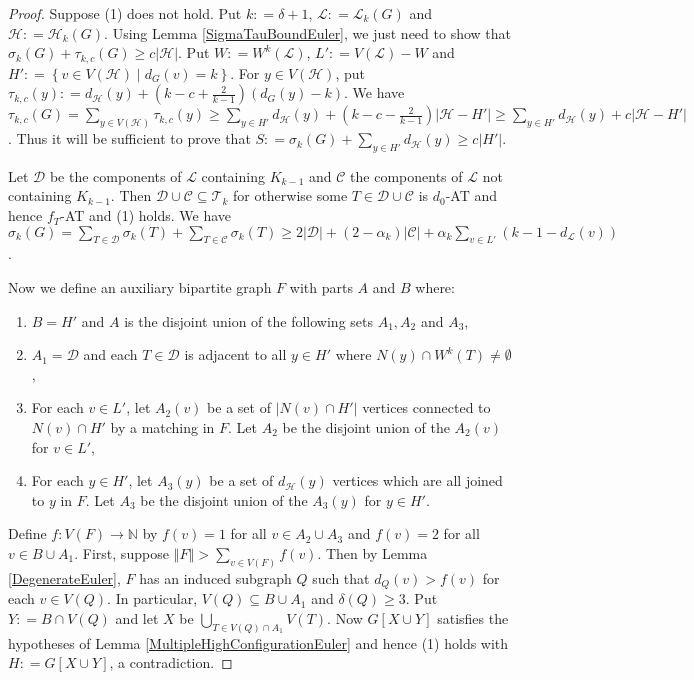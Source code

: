 \documentclass[12pt]{article}
\theoremstyle{plain}
\theoremstyle{definition}
\theoremstyle{remark}
\newcommand{\fancy}[1]{\mathcal{#1}}
\newcommand{\IN}{\mathbb{N}}
\newcommand{\CC}{\fancy{C}}
\newcommand{\D}{\fancy{D}}
\newcommand{\T}{\fancy{T}}
\renewcommand{\L}{\fancy{L}}
\newcommand{\HH}{\fancy{H}}
\newcommand{\setb}[3]{\left\{ #1 \in #2 \mid #3 \right\}}
\newcommand{\card}[1]{\left|#1\right|}
\newcommand{\size}[1]{\left\Vert#1\right\Vert}
\newcommand{\func}[3]{#1\colon #2 \rightarrow #3}
\newcommand{\parens}[1]{\left( #1 \right)}
\newcommand{\DefinedAs}{\mathrel{\mathop:}=}
\def\D{\fancy{D}}
\begin{document}
\begin{proof}
Suppose (1) does not hold. Put $k \DefinedAs \delta + 1$, $\L \DefinedAs \L_k(G)$ and $\HH \DefinedAs \HH_k(G)$.  Using Lemma \ref{SigmaTauBoundEuler}, we just need to show that $\sigma_k(G) + \tau_{k, c}(G) \geq c\card{\HH}$.  Put $W \DefinedAs W^k(\L)$, $L' \DefinedAs V(\L) - W$ and $H' \DefinedAs \setb{v}{V(\HH)}{d_G(v) = k}$.   For $y \in V(\HH)$, put $\tau_{k,c}(y) \DefinedAs d_{\HH}(y) + \parens{k-c + \frac{2}{k-1}}(d_G(y) - k)$.  We have  $\tau_{k,c}(G) = \sum_{y \in V(\HH)} \tau_{k,c}(y) \geq \sum_{y \in H'} d_{\HH}(y) + \parens{k-c - \frac{2}{k-1}}\card{\HH - H'} \geq \sum_{y \in H'} d_{\HH}(y) + c\card{\HH - H'}$.  Thus it will be sufficient to prove that $S \DefinedAs \sigma_k(G) + \sum_{y \in H'} d_{\HH}(y) \geq c\card{H'}$.

Let $\D$ be the components of $\L$ containing $K_{k-1}$ and $\CC$ the components of $\L$ not containing $K_{k-1}$.  Then $\D \cup \CC \subseteq \T_k$ for otherwise some $T \in \D \cup \CC$ is $d_0$-AT and hence $f_T$-AT and (1) holds.  We have $\sigma_k(G) = \sum_{T \in \D} \sigma_k(T) + \sum_{T \in \CC} \sigma_k(T) \geq 2\card{\D} + (2-\alpha_k)\card{\CC} + \alpha_k\sum_{v \in L'} \parens{k-1 - d_{\L}(v)}$.

Now we define an auxiliary bipartite graph $F$ with parts $A$ and $B$ where:

\begin{enumerate}
\item  $B = H'$ and $A$ is the disjoint union of the following sets
$A_1, A_2$ and $A_3$,
\item $A_1 = \D$ and each $T \in \D$ is adjacent to all $y \in H'$
where $N(y) \cap W^k(T) \neq \emptyset$,
\item For each $v \in L'$, let $A_2(v)$ be a set of $\card{N(v) \cap
H'}$ vertices connected to $N(v) \cap H'$ by a matching in $F$.  Let
$A_2$ be the disjoint union of the $A_2(v)$ for $v \in L'$,
\item For each $y \in H'$, let $A_3(y)$ be a set of $d_{\HH}(y)$ vertices
which are all joined to $y$ in $F$.  Let $A_3$ be the disjoint union
of the $A_3(y)$ for $y \in H'$.
\end{enumerate}

Define $\func{f}{V(F)}{\IN}$ by $f(v) = 1$ for all $v \in A_2 \cup A_3$ and $f(v) = 2$ for all $v \in B \cup A_1$.  First, suppose $\size{F} > \sum_{v \in V(F)} f(v)$.  Then by Lemma \ref{DegenerateEuler}, $F$ has an induced subgraph $Q$ such that $d_Q(v) > f(v)$ for each $v \in V(Q)$.  In particular, $V(Q) \subseteq B \cup A_1$ and $\delta(Q) \geq 3$.  Put $Y \DefinedAs B \cap V(Q)$ and let $X$ be $\bigcup_{T \in V(Q) \cap A_1} V(T)$. Now $G[X \cup Y]$ satisfies the hypotheses of Lemma \ref{MultipleHighConfigurationEuler} and hence (1) holds with $H \DefinedAs G[X \cup Y]$, a contradiction.


\end{proof}
\end{document}

